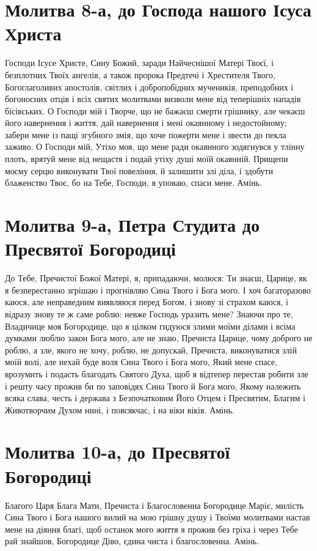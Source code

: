 \documentclass[chapters.tex]{subfiles}
\begin{document}
\section{Молитва 8-а, до Господа нашого Ісуса Христа}
Господи Ісусе Христе, Сину Божий, заради Найчеснішої Матері Твоєї, і безплотних Твоїх ангелів, а також пророка Предтечі і Хрестителя Твого, Богоглаголивих апостолів, світлих і добропобідних мучеників, преподобних і богоносних отців і всіх святих молитвами визволи мене від теперішніх нападів бісівських. О Господи мій і Творче, що не бажаєш смерти грішнику, але чекаєш його навернення і життя, дай навернення і мені окаянному і недостойному; забери мене із пащі згубного змія, що хоче пожерти мене і звести до пекла заживо. О Господи мій, Утіхо моя, що мене ради окаянного зодягнувся у тлінну плоть, врятуй мене від нещастя і подай утіху душі моїй окаянній. Прищепи моєму серцю виконувати Твої повеління, й залишити злі діла, і здобути блаженство Твоє, бо на Тебе, Господи, я уповаю, спаси мене. Амінь.

\section{Молитва 9-а, Петра Студита до Пресвятої Богородиці}
До Тебе, Пречистої Божої Матері, я, припадаючи, молюся: Ти знаєш, Царице, як я безперестанно згрішаю і прогнівляю Сина Твого і Бога мого. І хоч багаторазово каюся, але неправедним виявляюся перед Богом, і знову зі страхом каюся, і відразу знову те ж саме роблю: невже Господь уразить мене? Знаючи про те, Владичице моя Богородице, що я цілком гидуюся злими моїми ділами і всіма думками люблю закон Бога мого, але не знаю, Пречиста Царице, чому доброго не роблю, а зле, якого не хочу, роблю, не допускай, Пречиста, виконуватися злій моїй волі, але нехай буде воля Сина Твого і Бога мого, Який мене спасе, врозумить і подасть благодать Святого Духа, щоб я відтепер перестав робити зле і решту часу прожив би по заповідях Сина Твого й Бога мого, Якому належить всяка слава, честь і держава з Безпочатковим Його Отцем і Пресвятим, Благим і Животворчим Духом нині, і повсякчас, і на віки віків. Амінь.

\section{Молитва 10-а, до Пресвятої Богородиці}
Благого Царя Блага Мати, Пречиста і Благословенна Богородице Маріє, милість Сина Твого і Бога нашого вилий на мою грішну душу і Твоїми молитвами настав мене на діяння благі, щоб останок мого життя я прожив без гріха і через Тебе рай знайшов, Богородице Діво, єдина чиста і благословенна. Амінь.
\end{document}
